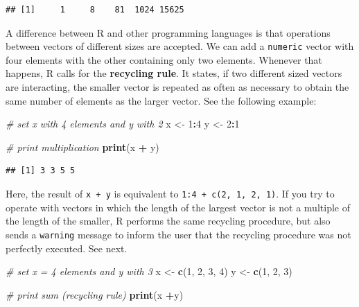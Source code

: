 \documentclass[11pt,]{book}
\newenvironment{Shaded}{\begin{snugshade}}{\end{snugshade}}
\newcommand{\KeywordTok}[1]{\textcolor[rgb]{0.27,0.27,0.27}{\textbf{#1}}}
\newcommand{\DecValTok}[1]{\textcolor[rgb]{0.06,0.06,0.06}{#1}}
\newcommand{\StringTok}[1]{\textcolor[rgb]{0.5,0.5,0.5}{#1}}
\newcommand{\CommentTok}[1]{\textcolor[rgb]{0.56,0.35,0.01}{\textit{#1}}}
\newcommand{\OperatorTok}[1]{\textcolor[rgb]{0.81,0.36,0.00}{\textbf{#1}}}
\newcommand{\NormalTok}[1]{#1}
\begin{document}
\begin{verbatim}
## [1]     1     8    81  1024 15625
\end{verbatim}

A difference between R and other programming languages is that
operations between vectors of different sizes are accepted. We can add a
\texttt{numeric} vector with four elements with the other containing
only two elements. Whenever that happens, R calls for the
\textbf{recycling rule}. It states, if two different sized vectors are
interacting, the smaller vector is repeated as often as necessary to
obtain the same number of elements as the larger vector. See the
following example: 

\begin{Shaded}
\begin{Highlighting}[]
\CommentTok{# set x with 4 elements and y with 2}
\NormalTok{x <-}\StringTok{ }\DecValTok{1}\OperatorTok{:}\DecValTok{4}
\NormalTok{y <-}\StringTok{ }\DecValTok{2}\OperatorTok{:}\DecValTok{1}

\CommentTok{# print multiplication}
\KeywordTok{print}\NormalTok{(x }\OperatorTok{+}\StringTok{ }\NormalTok{y)}
\end{Highlighting}
\end{Shaded}

\begin{verbatim}
## [1] 3 3 5 5
\end{verbatim}

Here, the result of \texttt{x\ +\ y} is equivalent to
\texttt{1:4\ +\ c(2,\ 1,\ 2,\ 1)}. If you try to operate with vectors in
which the length of the largest vector is not a multiple of the length
of the smaller, R performs the same recycling procedure, but also sends
a \texttt{warning} message to inform the user that the recycling
procedure was not perfectly executed. See next.

\begin{Shaded}
\begin{Highlighting}[]
\CommentTok{# set x = 4 elements and y with 3}
\NormalTok{x <-}\StringTok{ }\KeywordTok{c}\NormalTok{(}\DecValTok{1}\NormalTok{, }\DecValTok{2}\NormalTok{, }\DecValTok{3}\NormalTok{, }\DecValTok{4}\NormalTok{)}
\NormalTok{y <-}\StringTok{ }\KeywordTok{c}\NormalTok{(}\DecValTok{1}\NormalTok{, }\DecValTok{2}\NormalTok{, }\DecValTok{3}\NormalTok{)}

\CommentTok{# print sum (recycling rule)}
\KeywordTok{print}\NormalTok{(x }\OperatorTok{+}\NormalTok{y)}
\end{Highlighting}
\end{Shaded}
\end{document}
